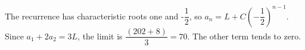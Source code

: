 The recurrence has characteristic roots one and -$\dfrac{1}{2}$, so $a_n=L+C(-\dfrac{1}{2})^{n-1}$. Since $a_1+2a_2=3L$, the limit is $\dfrac{(202+8)}{3}=\boxed{70}$. The other term tends to zero.
